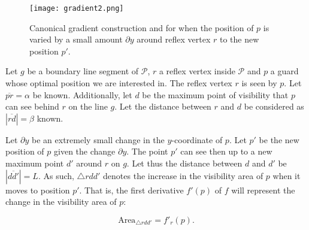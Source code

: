 \begin{figure}[h!]
    \centering
    \texttt{[image: gradient2.png]}
    \caption{Canonical gradient construction and for when the position of $p$ is varied by a small amount $\partial y$ around reflex vertex $r$ to the new position $p'$.}
    \label{fig:gradient}
\end{figure}

Let $g$ be a boundary line segment of $\mathcal P$, $r$ a reflex vertex inside $\mathcal P$ and $p$ a guard whose optimal position we are interested in. The reflex vertex $r$ is seen by $p$. Let $\overline{pr} = \alpha$ be known. Additionally, let $d$ be the maximum point of visibility that $p$ can see behind $r$ on the line $g$. Let the distance between $r$ and $d$ be considered as $|\overline{rd}| = \beta$ known. 



Let $\partial y$ be an extremely small change in the $y$-coordinate of $p$. Let $p'$ be the new position of $p$ given the change $\partial y$. The point $p'$ can see then up to a new maximum point $d'$ around $r$ on $g$. Let thus the distance between $d$ and $d'$ be $|\overline{dd'}| = L$. As such, $\triangle rdd'$ denotes the increase in the visibility area of $p$ when it moves to position $p'$. That is, the first derivative $f'(p)$ of $f$ will represent the change in the visibility area of $p$:

\begin{equation}
    \text{Area}_{\triangle rdd'} = f'_r(p). \label{eq:derivative}
\end{equation}







